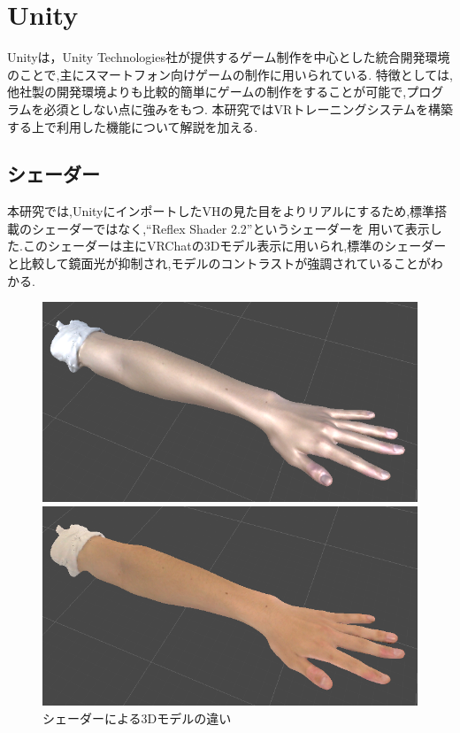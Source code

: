 \documentclass{ltjsreport}
\begin{document}
	\section{Unity}
		Unityは，Unity Technologies社が提供するゲーム制作を中心とした統合開発環境のことで,主にスマートフォン向けゲームの制作に用いられている.
		特徴としては,他社製の開発環境よりも比較的簡単にゲームの制作をすることが可能で,プログラムを必須としない点に強みをもつ.
		本研究ではVRトレーニングシステムを構築する上で利用した機能について解説を加える.
		\subsection{シェーダー}
			本研究では,UnityにインポートしたVHの見た目をよりリアルにするため,標準搭載のシェーダーではなく,``Reflex Shader 2.2''というシェーダーを
			用いて表示した.このシェーダーは主にVRChatの3Dモデル表示に用いられ,標準のシェーダーと比較して鏡面光が抑制され,モデルのコントラストが強調されていることがわかる.
			\begin{figure}[H]
			\centering
			\begin{minipage}{0.4\columnwidth}
			\centering
			\includegraphics[width = \columnwidth]{../figs/NomalShader.png}
			\end{minipage}
			\hspace{0.04\columnwidth}
			\begin{minipage}{0.4\columnwidth}
			\centering
			\includegraphics[width = \columnwidth]{../figs/ReflexShader.png}
			\end{minipage}
			\caption{シェーダーによる3Dモデルの違い}
			\label{fig:Shader}
			\end{figure}
\end{document}
